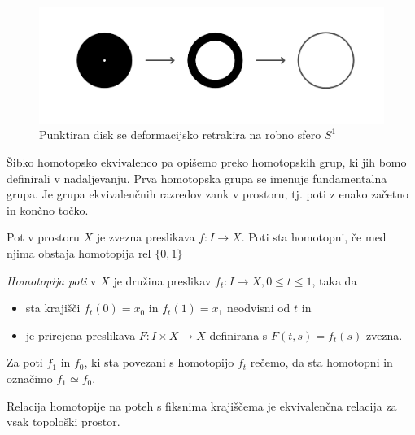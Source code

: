 \documentclass[mat1]{fmfdelo}
\begin{document}
\begin{figure}[h!]
    \centering
    \includegraphics[width=1\linewidth]{def-retract.png}
    \caption{Punktiran disk se deformacijsko retrakira na robno sfero $S^1$}
\end{figure}

Šibko homotopsko ekvivalenco pa opišemo preko homotopskih grup, ki
 jih bomo definirali v nadaljevanju. Prva homotopska grupa se imenuje
  fundamentalna grupa. Je grupa ekvivalenčnih razredov zank v prostoru, 
 tj. poti z enako začetno in končno točko.

Pot v prostoru $X$ je zvezna preslikava $ f\colon  I \rightarrow X$. Poti sta homotopni, če med njima obstaja homotopija rel $\{0,1\}$
\begin{definicija}
    
    \textit{Homotopija poti} v $X$ je družina preslikav $f_t\colon I \rightarrow X, 0\le t \le 1$, taka da
    \begin{itemize}
        \item 
        sta krajišči $f_t(0) = x_0$ in $f_t(1) = x_1$ neodvisni od $t$ in
        \item 
        je prirejena preslikava $F\colon I\times X \rightarrow X$ definirana s $F(t,s) = f_t(s)$ zvezna.
    \end{itemize}
    Za poti $f_1$ in $f_0$, ki sta povezani s homotopijo $f_t$ rečemo, da sta homotopni in označimo $f_1 \simeq f_0$.
\end{definicija}



\begin{trditev}
    Relacija homotopije na poteh s fiksnima krajiščema je ekvivalenčna relacija za vsak topološki prostor.
\end{trditev}
\end{document}

